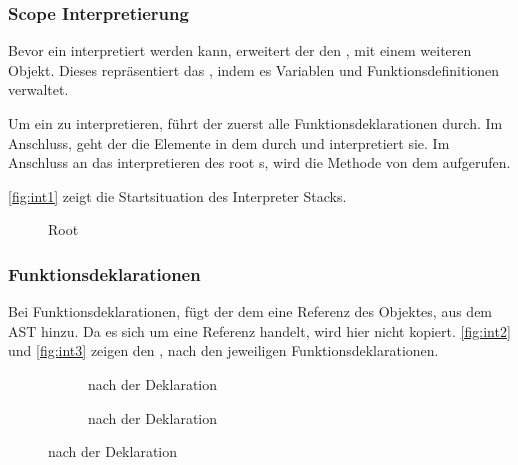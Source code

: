 {{    %
    \subsubsection{Scope Interpretierung}
    \label{sssec:Scope Interpretierung}
      Bevor ein  interpretiert werden kann, erweitert der  den , mit einem weiteren  Objekt. Dieses repräsentiert das , indem es Variablen und Funktionsdefinitionen verwaltet.

      Um ein  zu interpretieren, führt der  zuerst alle Funktionsdeklarationen durch. Im Anschluss, geht der  die  Elemente in dem  durch und interpretiert sie. Im Anschluss an das interpretieren des root s, wird die  Methode von dem  aufgerufen.

      \autoref{fig:int1} zeigt die Startsituation des Interpreter Stacks.
      \begin{figure}[H]
        \centering
        \caption{Root }
        \label{fig:int1}
      \end{figure}

    \subsubsection{Funktionsdeklarationen}
    \label{sssec:Funktionsdeklarationen}
      Bei Funktionsdeklarationen, fügt der  dem  eine Referenz des  Objektes, aus dem AST hinzu. Da es sich um eine Referenz handelt, wird hier nicht kopiert. \autoref{fig:int2} und \autoref{fig:int3} zeigen den , nach den jeweiligen Funktionsdeklarationen.
      \begin{figure}[H]
        \centering
        \begin{minipage}{.45\linewidth}
            \begin{figure}[H]
              \centering
              \caption{ nach der  Deklaration}
              \label{fig:int2}
            \end{figure}
        \end{minipage}%
        \begin{minipage}{.45\linewidth}
          \begin{figure}[H]
            \centering
            \caption{ nach der  Deklaration}
            \label{fig:int3}
          \end{figure}
        \end{minipage}
      \end{figure}


}}
